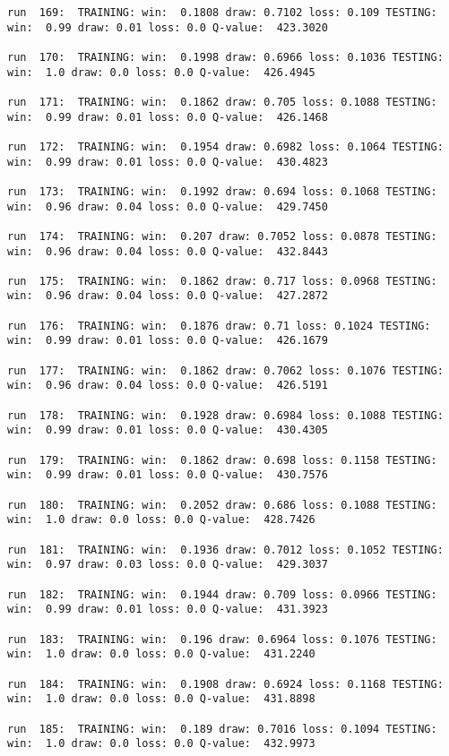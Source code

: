 \documentclass[11pt]{article}
\begin{document}
\begin{Verbatim}[commandchars=\\\{\}]
run  169:  TRAINING: win:  0.1808 draw: 0.7102 loss: 0.109 TESTING: win:  0.99 draw: 0.01 loss: 0.0 Q-value:  423.3020

run  170:  TRAINING: win:  0.1998 draw: 0.6966 loss: 0.1036 TESTING: win:  1.0 draw: 0.0 loss: 0.0 Q-value:  426.4945

run  171:  TRAINING: win:  0.1862 draw: 0.705 loss: 0.1088 TESTING: win:  0.99 draw: 0.01 loss: 0.0 Q-value:  426.1468

run  172:  TRAINING: win:  0.1954 draw: 0.6982 loss: 0.1064 TESTING: win:  0.99 draw: 0.01 loss: 0.0 Q-value:  430.4823

run  173:  TRAINING: win:  0.1992 draw: 0.694 loss: 0.1068 TESTING: win:  0.96 draw: 0.04 loss: 0.0 Q-value:  429.7450

run  174:  TRAINING: win:  0.207 draw: 0.7052 loss: 0.0878 TESTING: win:  0.96 draw: 0.04 loss: 0.0 Q-value:  432.8443

run  175:  TRAINING: win:  0.1862 draw: 0.717 loss: 0.0968 TESTING: win:  0.96 draw: 0.04 loss: 0.0 Q-value:  427.2872

run  176:  TRAINING: win:  0.1876 draw: 0.71 loss: 0.1024 TESTING: win:  0.99 draw: 0.01 loss: 0.0 Q-value:  426.1679

run  177:  TRAINING: win:  0.1862 draw: 0.7062 loss: 0.1076 TESTING: win:  0.96 draw: 0.04 loss: 0.0 Q-value:  426.5191

run  178:  TRAINING: win:  0.1928 draw: 0.6984 loss: 0.1088 TESTING: win:  0.99 draw: 0.01 loss: 0.0 Q-value:  430.4305

run  179:  TRAINING: win:  0.1862 draw: 0.698 loss: 0.1158 TESTING: win:  0.99 draw: 0.01 loss: 0.0 Q-value:  430.7576

run  180:  TRAINING: win:  0.2052 draw: 0.686 loss: 0.1088 TESTING: win:  1.0 draw: 0.0 loss: 0.0 Q-value:  428.7426

run  181:  TRAINING: win:  0.1936 draw: 0.7012 loss: 0.1052 TESTING: win:  0.97 draw: 0.03 loss: 0.0 Q-value:  429.3037

run  182:  TRAINING: win:  0.1944 draw: 0.709 loss: 0.0966 TESTING: win:  0.99 draw: 0.01 loss: 0.0 Q-value:  431.3923

run  183:  TRAINING: win:  0.196 draw: 0.6964 loss: 0.1076 TESTING: win:  1.0 draw: 0.0 loss: 0.0 Q-value:  431.2240

run  184:  TRAINING: win:  0.1908 draw: 0.6924 loss: 0.1168 TESTING: win:  1.0 draw: 0.0 loss: 0.0 Q-value:  431.8898

run  185:  TRAINING: win:  0.189 draw: 0.7016 loss: 0.1094 TESTING: win:  1.0 draw: 0.0 loss: 0.0 Q-value:  432.9973


\end{Verbatim}
\end{document}
